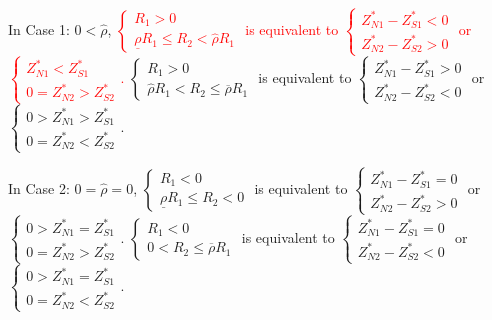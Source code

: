 \documentclass[10pt]{article}
\newcommand{\hhred}{\textcolor{red}}
\begin{document}
In Case 1: $ 0 < {\hat \rho} $, \hhred{$ \left\{ \begin{matrix} R_1 > 0 \\ \underline{\rho} R_1 \leqslant R_2 < {\hat \rho} R_1 \end{matrix} \right. $ is equivalent to $ \left\{ \begin{matrix} Z_{N 1}^* - Z_{S 1}^* < 0 \\ Z_{N 2}^* - Z_{S 2}^* > 0 \end{matrix} \right. $ or $ \left\{ \begin{matrix} Z_{N 1}^* < Z_{S 1}^* \\ 0 = Z_{N 2}^* > Z_{S 2}^* \end{matrix} \right. $.}
$ \left\{ \begin{matrix} R_1 > 0 \\ {\hat \rho} R_1 < R_2 \leqslant \overline{\rho} R_1 \end{matrix} \right. $ is equivalent to $ \left\{ \begin{matrix} Z_{N 1}^* - Z_{S 1}^* > 0 \\ Z_{N 2}^* - Z_{S 2}^* < 0 \end{matrix} \right. $ or $ \left\{ \begin{matrix} 0 > Z_{N 1}^* > Z_{S 1}^* \\ 0 = Z_{N 2}^* < Z_{S 2}^* \end{matrix} \right. $.

In Case 2: $ 0 = {\hat \rho} = 0 $, $ \left\{ \begin{matrix} R_1 < 0 \\ \underline{\rho} R_1 \leqslant R_2 < 0 \end{matrix} \right. $ is equivalent to $ \left\{ \begin{matrix} Z_{N 1}^* - Z_{S 1}^* = 0 \\ Z_{N 2}^* - Z_{S 2}^* > 0 \end{matrix} \right. $ or $ \left\{ \begin{matrix} 0 > Z_{N 1}^* = Z_{S 1}^* \\ 0 = Z_{N 2}^* > Z_{S 2}^* \end{matrix} \right. $.
$ \left\{ \begin{matrix} R_1 < 0 \\ 0 < R_2 \leqslant \overline{\rho} R_1 \end{matrix} \right. $ is equivalent to $ \left\{ \begin{matrix} Z_{N 1}^* - Z_{S 1}^* = 0 \\ Z_{N 2}^* - Z_{S 2}^* < 0 \end{matrix} \right. $ or $ \left\{ \begin{matrix} 0 > Z_{N 1}^* = Z_{S 1}^* \\ 0 = Z_{N 2}^* < Z_{S 2}^* \end{matrix} \right. $.
\end{document}
